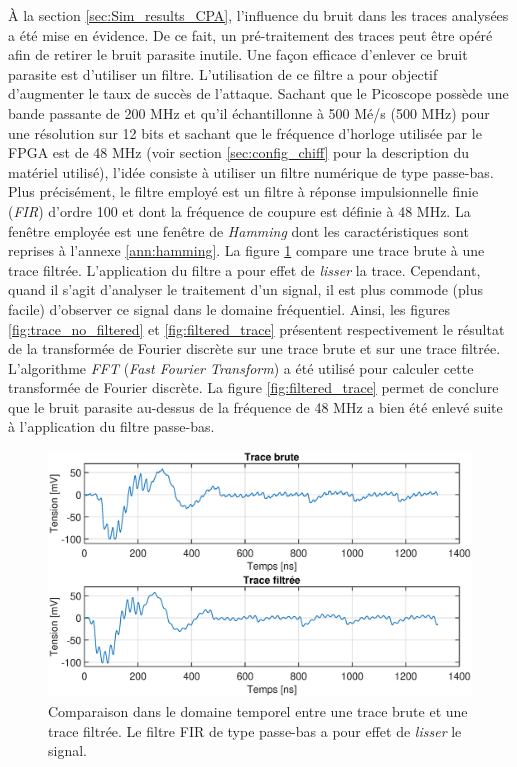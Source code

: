 \documentclass[oneside]{book}
\begin{document}
À la section \ref{sec:Sim_results_CPA}, l'influence du bruit dans les traces analysées a été mise en évidence. De ce fait, un pré-traitement des traces peut être opéré afin de retirer le bruit parasite inutile. Une façon efficace d'enlever ce bruit parasite est d'utiliser un filtre. L'utilisation de ce filtre a pour objectif d'augmenter le taux de succès de l'attaque. Sachant que le Picoscope possède une bande passante de 200 MHz et qu'il échantillonne à 500 Mé/s (500 MHz) pour une résolution sur 12 bits et sachant que le fréquence d'horloge utilisée par le FPGA est de 48 MHz (voir section \ref{sec:config_chiff} pour la description du matériel utilisé), l'idée consiste à utiliser un filtre numérique de type passe-bas. Plus précisément, le filtre employé est un filtre à réponse impulsionnelle finie (\textit{FIR}) d'ordre 100 et dont la fréquence de coupure est définie à 48 MHz. La fenêtre employée est une fenêtre de \textit{Hamming} \cite{noauthor_fenetrage_2019} dont les caractéristiques sont reprises à l'annexe \ref{ann:hamming}. La figure \ref{fig:traces_comparaison_bruit} compare une trace brute à une trace filtrée. L'application du filtre a pour effet de \textit{lisser} la trace. Cependant, quand il s'agit d'analyser le traitement d'un signal, il est plus commode (plus facile) d'observer ce signal dans le domaine fréquentiel. Ainsi, les figures \ref{fig:trace_no_filtered} et \ref{fig:filtered_trace} présentent respectivement le résultat de la transformée de Fourier discrète sur une trace brute et sur une trace filtrée. L'algorithme \textit{FFT} (\textit{Fast Fourier Transform}) a été utilisé pour calculer cette transformée de Fourier discrète. La figure \ref{fig:filtered_trace} permet de conclure que le bruit parasite au-dessus de la fréquence de 48 MHz a bien été enlevé suite à l'application du filtre passe-bas.

\begin{figure}[htbp]
    \hspace{-2cm}
    \includegraphics[scale=0.6]{image/traces_comparaison_bruit}
    \caption{Comparaison dans le domaine temporel entre une trace brute et une trace filtrée. Le filtre FIR de type passe-bas a pour effet de \textit{lisser} le signal.}
    \label{fig:traces_comparaison_bruit} 
\end{figure}
\end{document}
